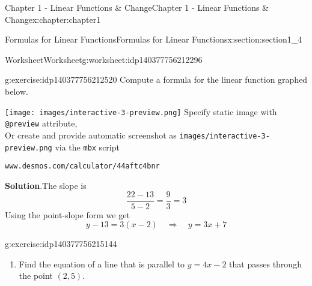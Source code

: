 \documentclass[oneside,10pt,]{book}
\newcommand{\blocktitlefont}{\relax}
\newcommand{\mono}[1]{\texttt{#1}}
\newlength{\qrsize}
\newlength{\previewwidth}
\begin{document}
\begin{chapterptx}{Chapter 1 - Linear Functions \& Change}{}{Chapter 1 - Linear Functions \& Change}{}{}{x:chapter:chapter1}
\begin{sectionptx}{Formulas for Linear Functions}{}{Formulas for Linear Functions}{}{}{x:section:section1_4}
\begin{tcbraster}[raster columns=2, raster column skip=1pt, raster halign=center, raster force size=false, raster left skip=0pt, raster right skip=0pt]
\end{tcbraster}%
%
%
\typeout{************************************************}
\typeout{************************************************}
%
\begin{worksheet-subsection}{Worksheet}{}{Worksheet}{}{}{g:worksheet:idp140377756212296}
\begin{divisionexercise}{1}{}{}{g:exercise:idp140377756212520}%
Compute a formula for the linear function graphed below.%
\par
\setlength{\qrsize}{9em}
\setlength{\previewwidth}{\linewidth}
\addtolength{\previewwidth}{-\qrsize}
\begin{tcbraster}[raster columns=2, raster column skip=1pt, raster halign=center, raster force size=false, raster left skip=0pt, raster right skip=0pt]%
\begin{tcolorbox}[previewstyle, width=\previewwidth]%
%
{\texttt{[image: images/interactive-3-preview.png]}}%
{\small{}Specify static image with \mono{@preview} attribute,\\Or create and provide automatic screenshot as \mono{images/interactive-3-preview.png} via the \mono{mbx} script}%
\end{tcolorbox}%
\begin{tcolorbox}[qrstyle]%
{\hypersetup{urlcolor=black}}%
\end{tcolorbox}%
\begin{tcolorbox}[captionstyle]%
\small \mono{www.desmos.com/calculator/44aftc4bnr}\end{tcolorbox}%
\end{tcbraster}%
%
\textbf{\blocktitlefont Solution}.\hypertarget{g:solution:idp140377756213976}{}\quad{}The slope is%
\begin{equation*}
\frac{22-13}{5-2} = \frac{9}{3} = 3 
\end{equation*}
Using the point-slope form we get%
\begin{equation*}
y-13 = 3(x-2) \quad \Rightarrow \quad y=3x+7 
\end{equation*}
\end{divisionexercise}%
\begin{divisionexercise}{2}{}{}{g:exercise:idp140377756215144}%
%
\begin{enumerate}[label=(\alph*)]
\item{}Find the equation of a line that is parallel to \(y=4x-2\) that passes through the point \((2,5)\).%

\end{enumerate}
\end{divisionexercise}
\end{worksheet-subsection}
\end{sectionptx}
\end{chapterptx}
\end{document}
